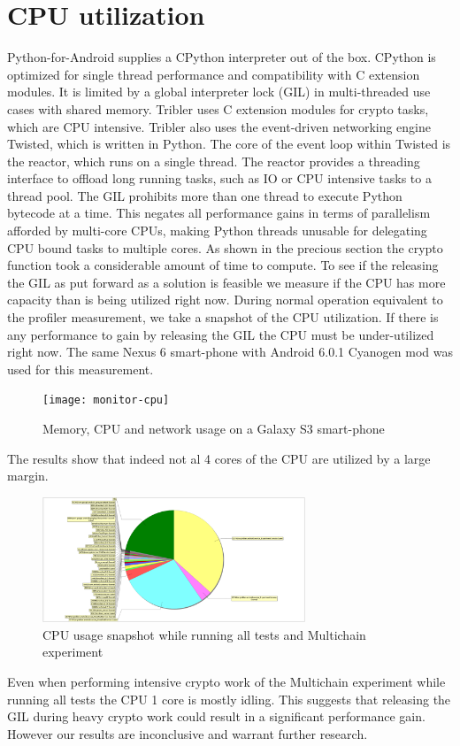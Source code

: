 \section{CPU utilization}
Python-for-Android supplies a CPython interpreter out of the box.
CPython is optimized for single thread performance and compatibility with C extension modules.
It is limited by a global interpreter lock (GIL) in multi-threaded use cases with shared memory.
Tribler uses C extension modules for crypto tasks, which are CPU intensive.
Tribler also uses the event-driven networking engine Twisted, which is written in Python.
The core of the event loop within Twisted is the reactor, which runs on a single thread.
The reactor provides a threading interface to offload long running tasks, such as IO or CPU intensive tasks to a thread pool.
The GIL prohibits more than one thread to execute Python bytecode at a time.
This negates all performance gains in terms of parallelism afforded by multi-core CPUs, making Python threads unusable for delegating CPU bound tasks to multiple cores.
As shown in the precious section the crypto function took a considerable amount of time to compute.
To see if the releasing the GIL as put forward as a solution is feasible we measure if the CPU has more capacity than is being utilized right now.
During normal operation equivalent to the profiler measurement, we take a snapshot of the CPU utilization.
If there is any performance to gain by releasing the GIL the CPU must be under-utilized right now.
The same Nexus 6 smart-phone with Android 6.0.1 Cyanogen mod was used for this measurement.
\begin{figure}[h]
	\centering %
	\texttt{[image: monitor-cpu]}
	\caption{Memory, CPU and network usage on a Galaxy S3 smart-phone}
	\label{fig:monitor-cpu}
\end{figure}
The results show that indeed not al 4 cores of the CPU are utilized by a large margin.
\begin{figure}[h]
	\centering
	\includegraphics[angle=90,origin=c,width=0.7\textwidth]{cpu_usage_2}
	\caption{CPU usage snapshot while running all tests and Multichain experiment}
	\label{fig:cpu_usage_2}
\end{figure}
Even when performing intensive crypto work of the Multichain experiment while running all tests the CPU 1 core is mostly idling.
This suggests that releasing the GIL during heavy crypto work could result in a significant performance gain.
However our results are inconclusive and warrant further research.


